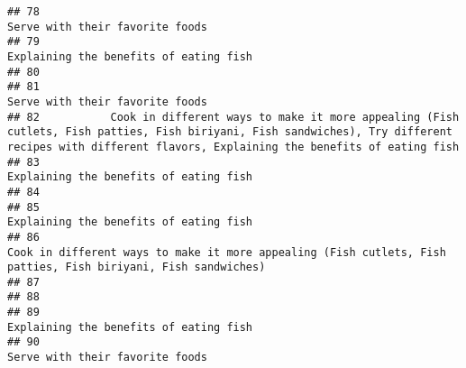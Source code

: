 \documentclass[
]{article}
\begin{document}
\begin{verbatim}
## 78                                                                                                                                                                               Serve with their favorite foods
## 79                                                                                                                                                                        Explaining the benefits of eating fish
## 80                                                                                                                                                                                                              
## 81                                                                                                                                                                               Serve with their favorite foods
## 82           Cook in different ways to make it more appealing (Fish cutlets, Fish patties, Fish biriyani, Fish sandwiches), Try different recipes with different flavors, Explaining the benefits of eating fish
## 83                                                                                                                                                                        Explaining the benefits of eating fish
## 84                                                                                                                                                                                                              
## 85                                                                                                                                                                        Explaining the benefits of eating fish
## 86                                                                                                 Cook in different ways to make it more appealing (Fish cutlets, Fish patties, Fish biriyani, Fish sandwiches)
## 87                                                                                                                                                                                                              
## 88                                                                                                                                                                                                              
## 89                                                                                                                                                                        Explaining the benefits of eating fish
## 90                                                                                                                                                                               Serve with their favorite foods

\end{verbatim}
\end{document}
